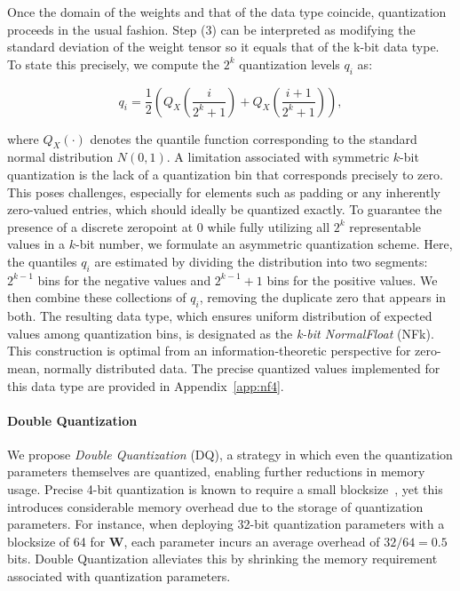 Once the domain of the weights and that of the data type coincide, quantization proceeds in the usual fashion. Step (3) can be interpreted as modifying the standard deviation of the weight tensor so it equals that of the k-bit data type. To state this precisely, we compute the $2^k$ quantization levels $q_i$ as:

\begin{equation}
q_i = \frac{1}{2}\left( Q_X\left(\frac{i}{2^k+1}\right) + Q_X\left(\frac{i+1}{2^k+1}\right)\right),
\end{equation}

where $Q_X(\cdot)$ denotes the quantile function corresponding to the standard normal distribution $N(0,1)$. A limitation associated with symmetric $k$-bit quantization is the lack of a quantization bin that corresponds precisely to zero. This poses challenges, especially for elements such as padding or any inherently zero-valued entries, which should ideally be quantized exactly. To guarantee the presence of a discrete zeropoint at $0$ while fully utilizing all $2^k$ representable values in a $k$-bit number, we formulate an asymmetric quantization scheme. Here, the quantiles $q_i$ are estimated by dividing the distribution into two segments: $2^{k-1}$ bins for the negative values and $2^{k-1} + 1$ bins for the positive values. We then combine these collections of $q_i$, removing the duplicate zero that appears in both. The resulting data type, which ensures uniform distribution of expected values among quantization bins, is designated as the \emph{k-bit NormalFloat} (NFk). This construction is optimal from an information-theoretic perspective for zero-mean, normally distributed data. The precise quantized values implemented for this data type are provided in Appendix~\ref{app:nf4}.

\paragraph{Double Quantization{}} 
We propose \emph{Double Quantization} (DQ), a strategy in which even the quantization parameters themselves are quantized, enabling further reductions in memory usage. Precise 4-bit quantization is known to require a small blocksize~\citep{dettmers2022case}, yet this introduces considerable memory overhead due to the storage of quantization parameters. For instance, when deploying 32-bit quantization parameters with a blocksize of 64 for $\mathbf{W}$, each parameter incurs an average overhead of $32/64 = 0.5$ bits. Double Quantization alleviates this by shrinking the memory requirement associated with quantization parameters.

